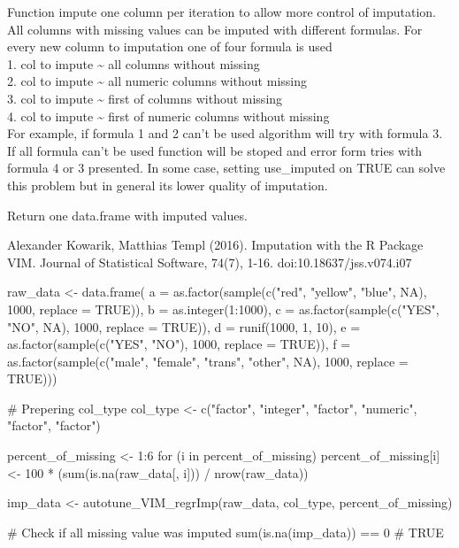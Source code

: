 \documentclass[letterpaper]{book}
\begin{document}
\begin{Details}\relax
Function impute one column per iteration to allow more control of imputation. All columns with missing values can be imputed with different formulas. For every new column to imputation one of four formula is used \\{}
1. col to impute \textasciitilde{} all columns without missing  \\{}
2. col to impute \textasciitilde{} all numeric columns without missing \\{}
3. col to impute \textasciitilde{} first of columns without missing \\{}
4. col to impute \textasciitilde{} first of numeric columns without missing \\{}
For example, if formula 1 and 2 can't be used algorithm will try with formula 3. If all formula can't be used function will be stoped and error form tries with formula 4 or 3 presented. In some case, setting use\_imputed on TRUE can solve this problem but in general its lower quality of imputation.
\end{Details}
%
\begin{Value}
Return one data.frame with imputed values.
\end{Value}
%
\begin{References}\relax
Alexander Kowarik, Matthias Templ (2016). Imputation with the R Package VIM. Journal of Statistical Software, 74(7), 1-16. doi:10.18637/jss.v074.i07
\end{References}
%
\begin{Examples}
\begin{ExampleCode}
{
  raw_data <- data.frame(
    a = as.factor(sample(c("red", "yellow", "blue", NA), 1000, replace = TRUE)),
    b = as.integer(1:1000),
    c = as.factor(sample(c("YES", "NO", NA), 1000, replace = TRUE)),
    d = runif(1000, 1, 10),
    e = as.factor(sample(c("YES", "NO"), 1000, replace = TRUE)),
    f = as.factor(sample(c("male", "female", "trans", "other", NA), 1000, replace = TRUE)))

  # Prepering col_type
  col_type <- c("factor", "integer", "factor", "numeric", "factor", "factor")

  percent_of_missing <- 1:6
  for (i in percent_of_missing) {
    percent_of_missing[i] <- 100 * (sum(is.na(raw_data[, i])) / nrow(raw_data))
  }


  imp_data <- autotune_VIM_regrImp(raw_data, col_type, percent_of_missing)

  # Check if all missing value was imputed
  sum(is.na(imp_data)) == 0
  # TRUE
}
\end{ExampleCode}
\end{Examples}
\end{document}
